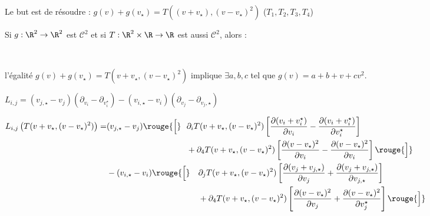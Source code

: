 \documentclass[12pt,a4paper]{article}
\begin{document}
\begin{dem}
{\begin{minipage}[t]{18cm}
			Le but est de résoudre : $g(v) + g(v_\star) = T((v+v_\star),(v-v_\star)^2)$ \hspace{.5cm} ($T_1,T_2,T_3,T_4$)
			\begin{lm} \begin{minipage}[t]{15cm}
					Si $g : \R^2 \to \R^2$ est $\mathcal C^2$ et si $T : \R^2 \times \R \to \R$ est aussi $\mathcal C^2$, alors :
				\end{minipage}\\
				\begin{minipage}[t]{18cm}
					l'égalité $g(v) + g(v_\star) = T(v+v_\star, (v-v_\star)^2)$ implique $\exists a,b,c$ tel que $g(v) = a+b+v+cv^2$.
				\end{minipage}
			\end{lm}
	\end{minipage}}

	\newpage

	\vspace*{-1.5cm}

			\hspace*{-.5cm}\begin{minipage}[t]{18cm}
				\begin{dem} $L_{i,j} = (v_{j,\star} - v_j)(\partial_{v_i}-\partial_{v_i^\star})-(v_{i,\star}-v_i)(\partial_{v_j} - \partial_{v_j,\star})$\\
				
			\begin{minipage}[t]{17.5cm}
			$\begin{aligned}
				L_{i,j}\left(T(v+v_\star,(v-v_\star)^2)\right) =& (v_{j,\star}-v_j)\rouge{\Big[}&&\hspace{-.5cm}\partial_i T(v+v_\star,(v-v_\star)^2)\left[\dfrac{\partial (v_i+v_i^\star)}{\partial v_i}-\dfrac{\partial (v_i+v_i^\star)}{\partial v_i^\star}\right]\\
				& &&\hspace{-.5cm}+\partial_4T(v+v_\star,(v-v_\star)^2)\left[\dfrac{\partial (v-v_\star)^2}{\partial v_i}-\dfrac{\partial (v-v_\star)^2}{\partial v_i}\right]\rouge{\Big]}\\
				&-(v_{i,\star}-v_i)\rouge{\Big[}&& \partial_jT(v+v_\star,(v-v_\star)^2)\left[\dfrac{\partial (v_j+v_{j,\star})}{\partial v_j} + \dfrac{\partial (v_j+v_{j,\star})}{\partial v_{j,\star}}\right]\\
				& &&+\partial_4T(v+v_\star,(v-v_\star)^2)\left[\dfrac{\partial (v-v_\star)^2}{\partial v_j} + \dfrac{\partial (v-v_\star)^2}{\partial v_j^\star}\right]\rouge{\Big]}
			\end{aligned}$\\
			

\end{minipage}
\end{dem}
\end{minipage}
\end{dem}
\end{document}

